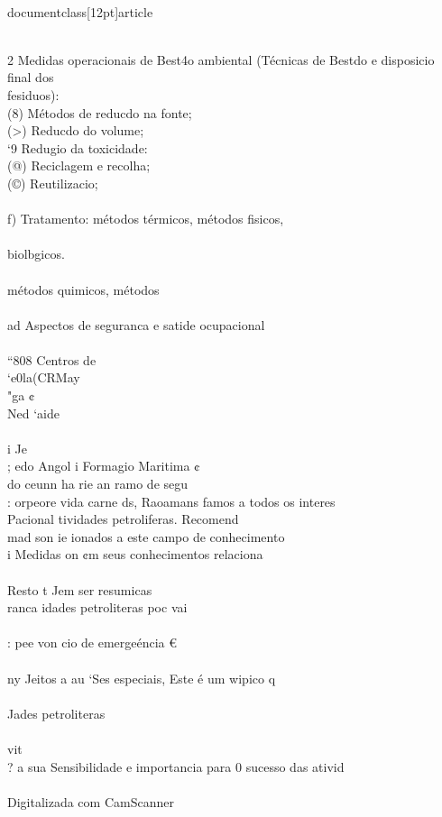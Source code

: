 \\documentclass[12pt]{article}
\begin{document}
{{{{\\
2 Medidas operacionais de Best4o ambiental (Técnicas de Bestdo e disposicio final dos\\
fesiduos):\\
(8) Métodos de reducdo na fonte;\\
(>) Reducdo do volume;\\
‘9 Redugio da toxicidade:\\
(@) Reciclagem e recolha;\\
(©) Reutilizacio;\\
\\{f) Tratamento: métodos térmicos, métodos fisicos,\\
\\
biolbgicos.\\
\\
métodos quimicos, métodos\\
\\
ad Aspectos de seguranca e satide ocupacional\\
\\
“808 Centros de\\
‘e0la(CRMay\\
"ga ¢\\
Ned ‘aide\\
\\
i Je\\
; edo Angol i Formagio Maritima ¢\\
do ceunn ha rie an ramo de segu\\
: orpeore vida carne ds, Raoamans famos a todos os interes\\
Pacional tividades petroliferas. Recomend\\
mad son ie ionados a este campo de conhecimento\\
i Medidas on ¢m seus conhecimentos relaciona\\
\\
Resto t Jem ser resumicas\\
ranca idades petroliteras poc vai\\
\\
: pee von cio de emergeéncia €\\
\\
ny Jeitos a au ‘Ses especiais, Este é um wipico q\\
\\
Jades petroliteras\\
\\
vit\\
? a sua Sensibilidade e importancia para 0 sucesso das ativid\\
\\
Digitalizada com CamScanner\\

}}}}}
\end{document}
